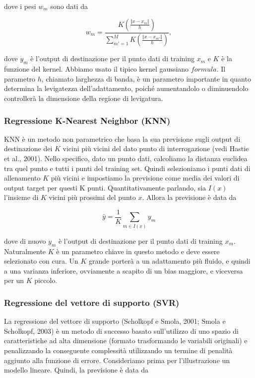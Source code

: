 \documentclass[12pt,a4paper]{report}
\begin{document}
dove i pesi $w_m$ sono dati da


\begin{equation}
    { \displaystyle w_m = \frac{K(\frac{\Vert x-x_m \Vert}{h})}{\sum_{m'=1}^{M}K(\frac{\Vert x-x_{m'} \Vert}{h})}},
\end{equation}

dove $y_m$ è l'output di destinazione per il punto dati di training $x_m$ e $K$ è la funzione del kernel. Abbiamo usato il tipico kernel gaussiano $formula$.
Il parametro $h$, chiamato larghezza di banda, è un parametro importante in quanto determina la levigatezza dell'adattamento, poiché aumentandolo o diminuendolo controllerà la dimensione della regione di levigatura.

\subsubsection{Regressione K-Nearest Neighbor (KNN)}
KNN è un metodo non parametrico che basa la sua previsione sugli output di destinazione dei $K$ vicini più vicini del dato punto di interrogazione (vedi Hastie et al., 2001). Nello specifico, dato un punto dati, calcoliamo la distanza euclidea tra quel punto e tutti i punti del training set. Quindi selezioniamo i punti dati di allenamento $K$ più vicini e impostiamo la previsione come media dei valori di output target per questi K punti. Quantitativamente parlando, sia $I(x)$ l'insieme di $K$ vicini più prossimi del punto $x$. Allora la previsione è data da

\begin{equation}
    {\displaystyle \hat{y} = \frac{1}{K} \sum\limits_{m \in I(x)} y_m}
\end{equation}

dove di nuovo $y_m$ è l'output di destinazione per il punto dati di training $x_m$.
Naturalmente $K$ è un parametro chiave in questo metodo e deve essere selezionato con cura. Un $K$ grande porterà a un adattamento più fluido, e quindi a una varianza inferiore, ovviamente a scapito di un bias maggiore, e viceversa per un $K$ piccolo.

\subsubsection{Regressione del vettore di supporto (SVR)}
La regressione del vettore di supporto (Scholkopf e Smola, 2001; Smola e Scholkopf, 2003) è un metodo di successo basato sull'utilizzo di uno spazio di caratteristiche ad alta dimensione (formato trasformando le variabili originali) e penalizzando la conseguente complessità utilizzando un termine di penalità aggiunto alla funzione di errore. Consideriamo prima per l'illustrazione un modello lineare. Quindi, la previsione è data da
\end{document}
